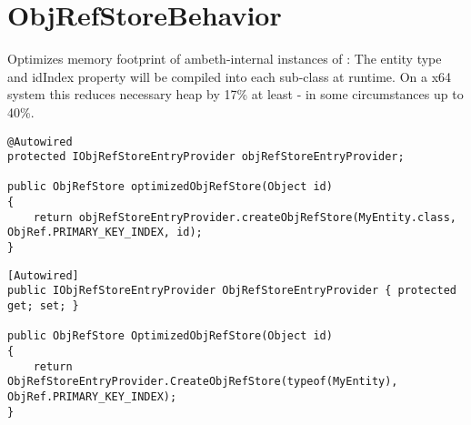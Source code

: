 \section{ObjRefStoreBehavior}
\label{feature:ObjRefStoreBehavior}
\ClearAPI
Optimizes memory footprint of ambeth-internal instances of : The entity type and idIndex property will be compiled into each sub-class at runtime. On a x64 system this reduces necessary heap by 17\% at least - in some circumstances up to 40\%.

\begin{lstlisting}[style=Java,caption={Example usage to receive a memory optimized instance of \type{ObjRefStore} (Java)}]
@Autowired
protected IObjRefStoreEntryProvider objRefStoreEntryProvider;

public ObjRefStore optimizedObjRefStore(Object id)
{
	return objRefStoreEntryProvider.createObjRefStore(MyEntity.class, ObjRef.PRIMARY_KEY_INDEX, id);
}
\end{lstlisting}
\begin{lstlisting}[style=Csharp,caption={Example usage to receive a memory optimized instance of \type{ObjRefStore} (C\#)}]
[Autowired]
public IObjRefStoreEntryProvider ObjRefStoreEntryProvider { protected get; set; }

public ObjRefStore OptimizedObjRefStore(Object id)
{
	return ObjRefStoreEntryProvider.CreateObjRefStore(typeof(MyEntity), ObjRef.PRIMARY_KEY_INDEX);
}
\end{lstlisting}
